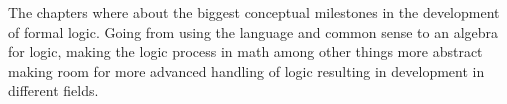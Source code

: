 \documentclass{article}
\begin{document}

The chapters where about the biggest conceptual milestones in the development of
formal logic. Going from using the language and common sense to an algebra for 
logic, making the logic process in math among other things more abstract making
room for more advanced handling of logic resulting in development in different
fields.
\end{document}
